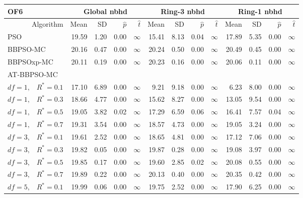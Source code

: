 \documentclass[12pt]{article}
\begin{document}
\begin{table}[ht]
\centering
\tiny{
\begin{tabular}{r|rrrr|rrrr|rrrr}
\multicolumn{1}{l}{OF6} & \multicolumn{4}{c}{Global nbhd} & \multicolumn{4}{c}{Ring-3 nbhd} & \multicolumn{4}{c}{Ring-1 nbhd}\\
  \hline
Algorithm & Mean & SD & $\widehat{p}$ & $\widehat{t}$ & Mean & SD & $\widehat{p}$ & $\widehat{t}$ & Mean & SD & $\widehat{p}$ & $\widehat{t}$ \\ 
  \hline
\multicolumn{1}{l|}{PSO} & 19.59 & 1.20 & 0.00 & $\infty$ & 15.41 & 8.13 & 0.04 & $\infty$ & 17.89 & 5.35 & 0.00 & $\infty$ \\ 
  \multicolumn{1}{l|}{BBPSO-MC} & 20.16 & 0.47 & 0.00 & $\infty$ & 20.24 & 0.50 & 0.00 & $\infty$ & 20.49 & 0.45 & 0.00 & $\infty$ \\ 
  \multicolumn{1}{l|}{BBPSOxp-MC} & 20.11 & 0.19 & 0.00 & $\infty$ & 20.23 & 0.16 & 0.00 & $\infty$ & 20.06 & 0.11 & 0.00 & $\infty$ \\ 
\hline
\multicolumn{1}{l|}{AT-BBPSO-MC} &&&&&&&&&&&&\\
  $df = 1,\enspace$ $R^* =0.1$ & 17.10 & 6.89 & 0.00 & $\infty$ & 9.21 & 9.18 & 0.00 & $\infty$ & 6.23 & 8.00 & 0.00 & $\infty$ \\ 
  $df = 1,\enspace$ $R^* =0.3$ & 18.66 & 4.77 & 0.00 & $\infty$ & 15.62 & 8.27 & 0.00 & $\infty$ & 13.05 & 9.54 & 0.00 & $\infty$ \\ 
  $df = 1,\enspace$ $R^* =0.5$ & 19.05 & 3.82 & 0.02 & $\infty$ & 17.29 & 6.59 & 0.06 & $\infty$ & 16.41 & 7.57 & 0.04 & $\infty$ \\ 
  $df = 1,\enspace$ $R^* =0.7$ & 19.31 & 3.54 & 0.00 & $\infty$ & 18.57 & 4.73 & 0.00 & $\infty$ & 19.05 & 3.24 & 0.00 & $\infty$ \\ 
  $df = 3,\enspace$ $R^* =0.1$ & 19.61 & 2.52 & 0.00 & $\infty$ & 18.65 & 4.81 & 0.00 & $\infty$ & 17.12 & 7.06 & 0.00 & $\infty$ \\ 
  $df = 3,\enspace$ $R^* =0.3$ & 19.82 & 0.05 & 0.00 & $\infty$ & 19.87 & 0.28 & 0.00 & $\infty$ & 19.08 & 3.97 & 0.00 & $\infty$ \\ 
  $df = 3,\enspace$ $R^* =0.5$ & 19.85 & 0.17 & 0.00 & $\infty$ & 19.60 & 2.85 & 0.02 & $\infty$ & 20.08 & 0.55 & 0.00 & $\infty$ \\ 
  $df = 3,\enspace$ $R^* =0.7$ & 19.89 & 0.22 & 0.00 & $\infty$ & 20.13 & 0.40 & 0.00 & $\infty$ & 20.35 & 0.42 & 0.00 & $\infty$ \\ 
  $df = 5,\enspace$ $R^* =0.1$ & 19.99 & 0.06 & 0.00 & $\infty$ & 19.75 & 2.52 & 0.00 & $\infty$ & 17.90 & 6.25 & 0.00 & $\infty$ \\ 

\end{tabular}}
\end{table}
\end{document}
